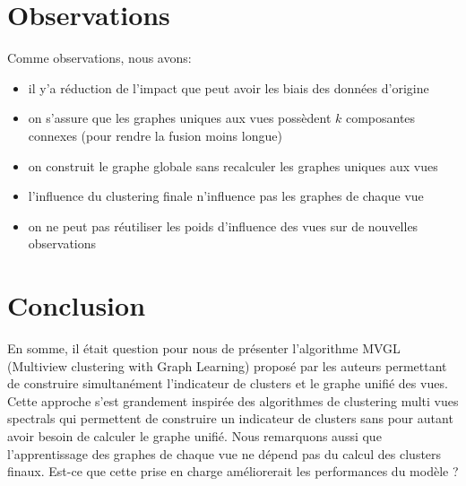 \documentclass[12pt, french, latin.medieval, a4paper]{report}
\begin{document}
	\section{Observations}
	Comme observations, nous avons:
	\begin{itemize}
    	\item { il y'a réduction de l'impact que peut avoir les biais des données d'origine}
    	\item { on s'assure que les graphes uniques aux vues possèdent $k$ composantes connexes (pour rendre la fusion moins longue)}
    	\item { on construit le graphe globale sans recalculer les graphes uniques aux vues }
    	\item { l'influence du clustering finale n'influence pas les graphes de chaque vue }
    	\item { on ne peut pas réutiliser les poids d'influence des vues sur de nouvelles observations }
	\end{itemize}

	\section{Conclusion}
    En somme, il était question pour nous de présenter l'algorithme MVGL (Multiview clustering with Graph Learning) proposé par les auteurs permettant de construire simultanément l'indicateur de clusters et le graphe unifié des vues.
	Cette approche s'est grandement inspirée des algorithmes de clustering multi vues spectrals qui permettent de construire un indicateur de clusters sans pour autant avoir besoin de calculer le graphe unifié.
	Nous remarquons aussi que l'apprentissage des graphes de chaque vue ne dépend pas du calcul des clusters finaux.
	Est-ce que cette prise en charge améliorerait les performances du modèle ?
 

	
\end{document}

